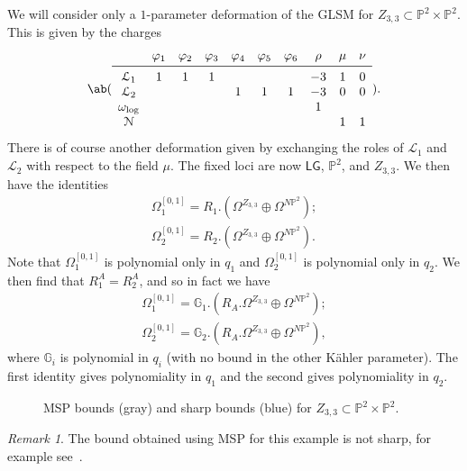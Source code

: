 \documentclass[10pt,oldfontcommands,oneside]{memoir}
\theoremstyle{definition}
\theoremstyle{remark}
\newtheorem{rmk}[thm]{Remark}
\theoremstyle{plain}
\theoremstyle{definition}
\theoremstyle{remark}
\newcommand{\G}{\mathbb{G}}
\renewcommand{\P}{\mathbb{P}}
\newcommand{\mc}[1]{\mathcal{#1}}
\newcommand{\ms}[1]{\mathsf{#1}}
\newcommand{\1}{\mathbf{1}}
\newcommand{\2}{\mathbf{2}}
\newcommand{\3}{\mathbf{3}}
\newcommand{\LG}{\ms{LG}}
\begin{document}
We will consider only a $1$-parameter deformation of the GLSM for $Z_{3,3} \subset \P^2 \times \P^2$. This is given by the charges
\[ \ab(\begin{array}{cccccccccc}
    & \varphi_1 & \varphi_2 & \varphi_3 & \varphi_4 & \varphi_5 & \varphi_6 & \rho & \mu & \nu \\
    \midrule
    \mc{L}_1 & 1 & 1 & 1 & & & & -3 & 1 & 0 \\
    \mc{L}_2 & & & & 1 & 1 & 1 & -3 & 0 & 0 \\
    \omega_{\log} & & & & & & & 1 & & \\
    \mc{N} & & & & & & & & 1 & 1
\end{array}). \]
There is of course another deformation given by exchanging the roles of $\mc{L}_1$ and $\mc{L}_2$ with respect to the field $\mu$.
The fixed loci are now $\LG$, $\P^2$, and $Z_{3,3}$. We then have the identities
\begin{align*}
    \Omega_1^{[0,1]} = R_1 . (\Omega^{Z_{3,3}} \oplus \Omega^{N\P^2}); \\ 
    \Omega_2^{[0,1]} = R_2 . (\Omega^{Z_{3,3}} \oplus \Omega^{N\P^2}). 
\end{align*}
Note that $\Omega_1^{[0,1]}$ is polynomial only in $q_1$ and $\Omega_2^{[0,1]}$ is polynomial only in $q_2$. We then find that $R_1^A = R_2^A$, and so in fact we have
\begin{align*}
    \Omega_1^{[0,1]} = \G_1 . (R_A. \Omega^{Z_{3,3}} \oplus \Omega^{N\P^2}); \\ 
    \Omega_2^{[0,1]} = \G_2 . (R_A .\Omega^{Z_{3,3}} \oplus \Omega^{N\P^2}), 
\end{align*}
where $\G_i$ is polynomial in $q_i$ (with no bound in the other K\"ahler parameter). The first identity gives polynomiality in $q_1$ and the second gives polynomiality in $q_2$.
    \begin{figure}[htpb]
    \begin{center}
    \end{center}
    \caption{MSP bounds (gray) and sharp bounds (blue) for $Z_{3,3} \subset \P^2 \times \P^2$.}%
    \label{fig:bounds}
    \end{figure}

\begin{rmk}
    The bound obtained using MSP for this example is not sharp, for example see~.
\end{rmk}

\sloppy
\printbibliography
\end{document}

